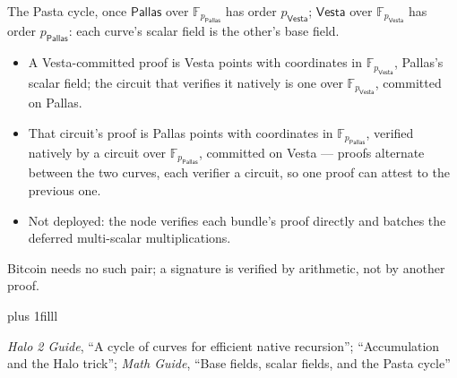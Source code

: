 \documentclass[aspectratio=169,11pt]{beamer}
\newcommand{\F}{\mathbb{F}}
\newcommand{\Pallas}{\ensuremath{\mathsf{Pallas}}}
\newcommand{\Vesta}{\ensuremath{\mathsf{Vesta}}}
\newcommand{\Fpp}{\ensuremath{\F_{p_{\Pallas}}}}
\newcommand{\Fpv}{\ensuremath{\F_{p_{\Vesta}}}}
\newcommand{\src}[1]{\par\vskip0pt plus 1filll
  {\fontsize{6}{7.2}\selectfont\color{arbdim}\raggedright #1\par}}
\begin{document}
\begin{frame}{The Pasta cycle, once}
\Pallas{} over $\Fpp$ has order $p_{\Vesta}$; \Vesta{} over $\Fpv$ has
order $p_{\Pallas}$: each curve's scalar field is the other's base field.
\begin{itemize}
  \item A Vesta-committed proof is Vesta points with coordinates in
    $\Fpv$, Pallas's scalar field; the circuit that verifies it natively
    is one over $\Fpv$, committed on Pallas.
  \item That circuit's proof is Pallas points with coordinates in
    $\Fpp$, verified natively by a circuit over $\Fpp$, committed on
    Vesta --- proofs alternate between the two curves, each verifier a
    circuit, so one proof can attest to the previous one.
  \item Not deployed: the node verifies each bundle's proof directly and
    batches the deferred multi-scalar multiplications.
\end{itemize}
Bitcoin needs no such pair; a signature is verified by arithmetic, not
by another proof.
\src{\emph{Halo 2 Guide}, ``A cycle of curves for efficient native
recursion''; ``Accumulation and the Halo trick''; \emph{Math Guide},
``Base fields, scalar fields, and the Pasta cycle''}
\end{frame}
\end{document}
